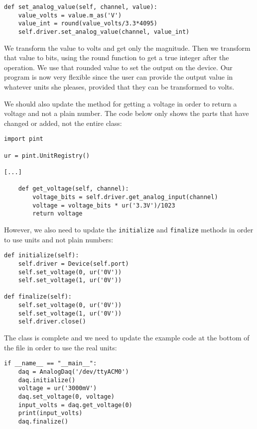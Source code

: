 \begin{verbatim}
def set_analog_value(self, channel, value):
    value_volts = value.m_as('V')
    value_int = round(value_volts/3.3*4095)
    self.driver.set_analog_value(channel, value_int)
\end{verbatim}

We transform the value to volts and get only the magnitude. Then we transform that value to bits, using the round function to get a true integer after the operation. We use that rounded value to set the output on the device. Our program is now very flexible since the user can provide the output value in whatever units she pleases, provided that they can be transformed to volts.


We should also update the method for getting a voltage in order to return a voltage and not a plain number. The code below only shows the parts that have changed or added, not the entire class:

\begin{verbatim}
import pint

ur = pint.UnitRegistry()

[...]

    def get_voltage(self, channel):
        voltage_bits = self.driver.get_analog_input(channel)
        voltage = voltage_bits * ur('3.3V')/1023
        return voltage
\end{verbatim}

However, we also need to update the \texttt{initialize} and \texttt{finalize} methods in order to use units and not plain numbers:

\begin{verbatim}
def initialize(self):
    self.driver = Device(self.port)
    self.set_voltage(0, ur('0V'))
    self.set_voltage(1, ur('0V'))
            
def finalize(self):
    self.set_voltage(0, ur('0V'))
    self.set_voltage(1, ur('0V'))
    self.driver.close()
\end{verbatim}

The class is complete and we need to update the example code at the bottom of the file in order to use the real units:

\begin{verbatim}
if __name__ == "__main__":
    daq = AnalogDaq('/dev/ttyACM0')
    daq.initialize()
    voltage = ur('3000mV')
    daq.set_voltage(0, voltage)
    input_volts = daq.get_voltage(0)
    print(input_volts)
    daq.finalize()
\end{verbatim}

